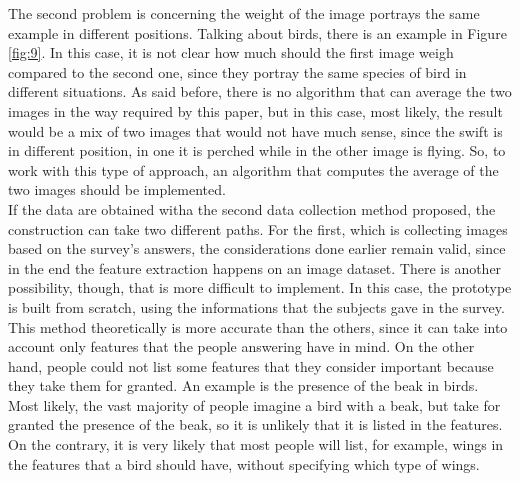 \documentclass[conference]{IEEEtran}
\begin{document}
			\noindent The second problem is concerning the weight of the image portrays the same example in different positions. Talking about birds, there is an example in Figure \ref{fig:9}. In this case, it is not clear 
			how much should the first image weigh compared to the second one, since they portray the same species of bird in different situations. As said before, there is no algorithm that can average the two images in the 
			way required by this paper, but in this case, most likely, the result would be a mix of two images that would not have much sense, since the swift is in different position, in one it is perched while in the other 
			image is flying. So, to work with this type of approach, an algorithm that computes the average of the two images should be implemented.\\
			If the data are obtained witha the second data collection method proposed, the construction can take two different paths. For the first, which is collecting images based on the survey's answers, the 
			considerations done earlier remain valid, since in the end the feature extraction happens on an image dataset. There is another possibility, though, that is more difficult to implement. In this case, the 
			prototype is built from scratch, using the informations that the subjects gave in the survey. This method theoretically is more accurate than the others, since it can take into account only features 
			that the people answering have in mind. On the other hand, people could not list some features that they consider important because they take them for granted. An example is the presence of the beak in birds. 
			Most likely, the vast majority of people imagine a bird with a beak, but take for granted the presence of the beak, so it is unlikely that it is listed in the features. On the contrary, it is very likely that 
			most people will list, for example, wings in the features that a bird should have, without specifying which type of wings. 
			
\end{document}
